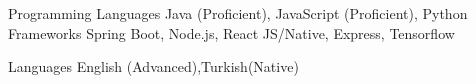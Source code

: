 

\begin{cvskills}

  \cvskill
    {Programming Languages} %
    {Java (Proficient), JavaScript (Proficient), Python} %
  \cvskill
    {Frameworks} %
    {Spring Boot, Node.js, React JS/Native, Express, Tensorflow } %


  \cvskill
    {Languages} %
    {English (Advanced),Turkish(Native)} %

\end{cvskills}
